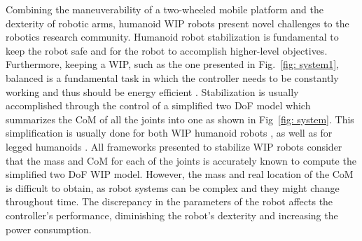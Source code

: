 \documentclass[letterpaper, 10 pt, conference]{ieeeconf}  %
\newcommand{\Bogdan}[1]{\textcolor{red}{\textbf{Bogdan:} #1}}
\begin{document}
Combining the maneuverability of a two-wheeled mobile platform and the dexterity of robotic arms, humanoid \ac{WIP} robots present novel challenges to the robotics research community.
Humanoid robot stabilization is fundamental to keep the robot safe and for the robot to accomplish higher-level objectives.
Furthermore, keeping a \ac{WIP}, such as the one presented in Fig.~\ref{fig: system1}, balanced is a fundamental task in which the controller needs to be constantly working and thus should be energy efficient \cite{Bature2014}.
Stabilization is usually accomplished through the control of a simplified two \ac{DoF} model which summarizes the \ac{CoM} of all the joints into one as shown in Fig~\ref{fig: system}. This simplification is usually done for both \ac{WIP} humanoid robots \cite{Zafar2016,canete2012disturbance, takei2009baggage}, as well as for legged humanoids \cite{Carpentier2016, Muscolo2011, Kudruss2015}.
All frameworks presented to stabilize \ac{WIP} robots consider that the mass and \ac{CoM} for each of the joints is accurately known \cite{SangJoo2007,Sihite2018,Pajon2017} to compute the simplified two \ac{DoF}  WIP model. However, the mass and real location of the \ac{CoM} is difficult to obtain, as robot systems can be complex and they might change throughout time. The discrepancy in the parameters of the robot affects the controller's performance, diminishing the robot's dexterity and increasing the power consumption.
\end{document}
